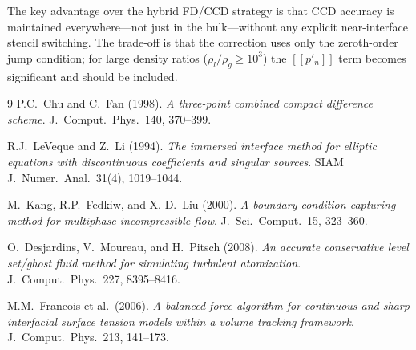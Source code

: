 \documentclass[11pt, a4paper]{article}
\newcommand{\jump}[1]{[\![#1]\!]}
\begin{document}
The key advantage over the hybrid FD/CCD strategy is that CCD accuracy is
maintained everywhere---not just in the bulk---without any explicit
near-interface stencil switching.
The trade-off is that the correction uses only the zeroth-order jump condition;
for large density ratios ($\rho_l/\rho_g \geq 10^3$) the $\jump{p'_n}$
term becomes significant and should be included.

\begin{thebibliography}{9}
P.C.\ Chu and C.\ Fan (1998).
\textit{A three-point combined compact difference scheme}.
J.\ Comput.\ Phys.\ 140, 370--399.

R.J.\ LeVeque and Z.\ Li (1994).
\textit{The immersed interface method for elliptic equations with discontinuous
coefficients and singular sources}.
SIAM J.\ Numer.\ Anal.\ 31(4), 1019--1044.

M.\ Kang, R.P.\ Fedkiw, and X.-D.\ Liu (2000).
\textit{A boundary condition capturing method for multiphase incompressible flow}.
J.\ Sci.\ Comput.\ 15, 323--360.

O.\ Desjardins, V.\ Moureau, and H.\ Pitsch (2008).
\textit{An accurate conservative level set/ghost fluid method for simulating
turbulent atomization}.
J.\ Comput.\ Phys.\ 227, 8395--8416.

M.M.\ Francois et al.\ (2006).
\textit{A balanced-force algorithm for continuous and sharp interfacial surface
tension models within a volume tracking framework}.
J.\ Comput.\ Phys.\ 213, 141--173.
\end{thebibliography}
\end{document}
